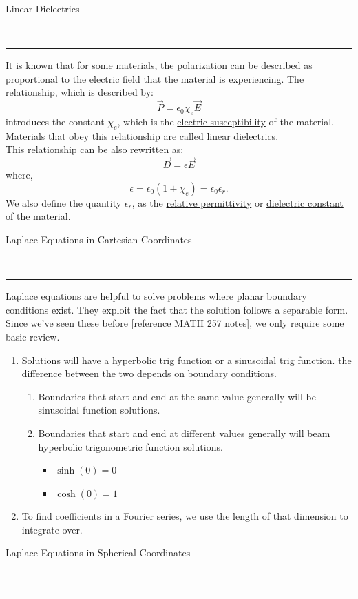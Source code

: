 \documentclass{article}
\newcommand{\header}[1]{\begin{large}\noindent #1\end{large}\\\rule{\textwidth}{0.5pt}}
\newcommand{\gap}{\medskip\\}
\begin{document}
\header{Linear Dielectrics}

It is known that for some materials, the polarization can be described as proportional to
the electric field that the material is experiencing. The relationship, which is described
by:
\[
    \vec{P} = \epsilon_0 \chi_e \vec{E}
\]
introduces the constant $\chi_e$, which is the \underline{electric susceptibility} of the
material. Materials that obey this relationship are called \underline{linear dielectrics}.
\gap
This relationship can be also rewritten as:
\[
    \vec{D} = \epsilon \vec{E}
\]
where, 
\[
    \epsilon = \epsilon_0 (1 + \chi_e) = \epsilon_0 \epsilon_r.    
\]
We also define the quantity $\epsilon_r$, as the \underline{relative permittivity} or 
\underline{dielectric constant} of the material.

\pagebreak

\header{Laplace Equations in Cartesian Coordinates}

Laplace equations are helpful to solve problems where planar boundary conditions exist.
They exploit the fact that the solution follows a separable form. Since we've seen these 
before [reference MATH 257 notes], we only require some basic review.
\begin{enumerate}
    \item Solutions will have a hyperbolic trig function or a sinusoidal trig function.
    the difference between the two depends on boundary conditions.
    \begin{enumerate}
        \item Boundaries that start and end at the same value generally will be 
        sinusoidal function solutions.
        \item Boundaries that start and end at different values generally will beam
        hyperbolic trigonometric function solutions.
        \begin{itemize}
            \item $\sinh(0) = 0$
            \item $\cosh(0) = 1$
        \end{itemize}
    \end{enumerate}
    \item To find coefficients in a Fourier series, we use the length of that dimension 
    to integrate over. 
\end{enumerate}

\header{Laplace Equations in Spherical Coordinates}
\end{document}
